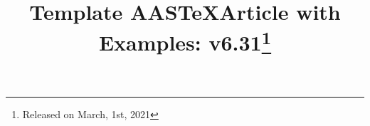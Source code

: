 \documentclass[linenumbers]{aastex631}
\newcommand\aastex{AAS\TeX}
\begin{document}
\title{Template \aastex Article with Examples: 
v6.31\footnote{Released on March, 1st, 2021}}


\end{document}
